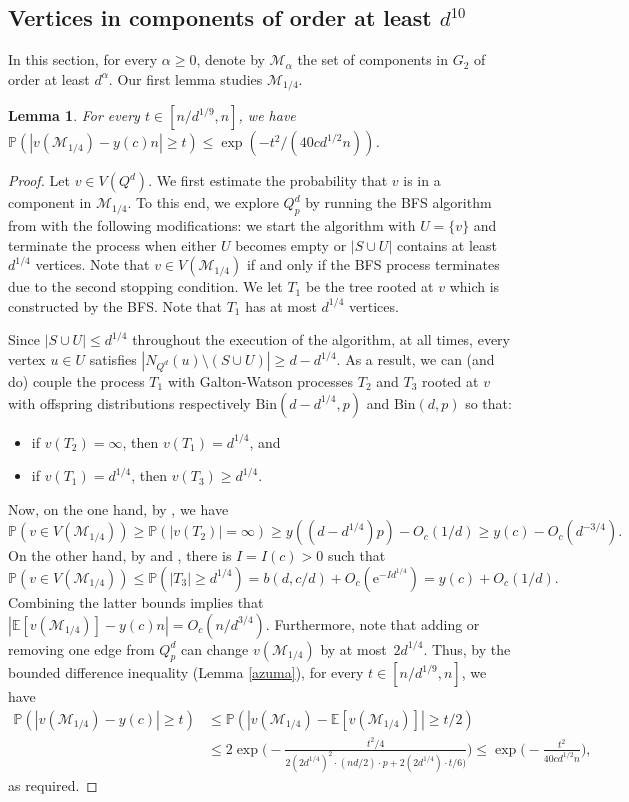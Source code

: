 \documentclass[reqno,final,a4paper]{amsart}
\newtheorem{lemma}[thm]{Lemma}
\theoremstyle{definition}
\newcommand{\cM}{\mathcal{M}}
\def\e{\mathrm{e}}
\newcommand{\1}{\mathbbm{1}}
\begin{document}
\subsection{\texorpdfstring{Vertices in components of order at least $d^{10}$}{Vertices in large components}}\label{subsec: vol}
In this section, for every $\alpha \ge 0$, denote by $\cM_\alpha$ the set of components in $G_2$ of order at least $d^{\alpha}$.
Our first lemma studies $\cM_{1/4}$.
\begin{lemma}\label{l: volume of large}
For every $t\in [n/d^{1/9},n]$, we have
$\mathbb{P}(|v(\cM_{1/4}) - y(c)n|\ge t)\le \exp(-t^2/(40cd^{1/2}n))$.
\end{lemma}
\begin{proof}
Let $v\in V(Q^d)$.
We first estimate the probability that $v$ is in a component in $\cM_{1/4}$. 
To this end, we explore $Q^d_p$ by running the BFS algorithm from  with the following modifications: we start the algorithm with $U=\{v\}$ and terminate the process when either $U$ becomes empty or $|S\cup U|$ contains at least $d^{1/4}$ vertices. 
Note that $v\in V(\cM_{1/4})$ if and only if the BFS process terminates due to the second stopping condition. 
We let $T_1$ be the tree rooted at $v$ which is constructed by the BFS. Note that $T_1$ has at most $d^{1/4}$ vertices.

Since $|S\cup U|\le d^{1/4}$ throughout the execution of the algorithm, at all times, every vertex $u\in U$ satisfies $|N_{Q^d}(u)\setminus (S\cup U)|\ge d-d^{1/4}$. 
As a result, we can (and do) couple the process $T_1$ with Galton-Watson processes $T_2$ and $T_3$ rooted at $v$ with offspring distributions respectively $\mathrm{Bin}(d-d^{1/4},p)$ and $\mathrm{Bin}(d,p)$ so that:
\begin{itemize}
    \item if $v(T_2)=\infty$, then $v(T_1)=d^{1/4}$, and
    \item if $v(T_1)=d^{1/4}$, then $v(T_3)\ge d^{1/4}$.
\end{itemize}

Now, on the one hand, by , we have 
\[\mathbb{P}(v\in V(\cM_{1/4}))\ge \mathbb{P}(|v(T_2)|=\infty) \ge y((d-d^{1/4})p)-O_c(1/d)\ge y(c)-O_c(d^{-3/4}).\] 
On the other hand, by  and , there is $I=I(c)>0$ such that 
\[\mathbb{P}(v\in V(\cM_{1/4}))\le \mathbb P(|T_3|\ge d^{1/4})=b(d,c/d)+O_c(\e^{-Id^{1/4}})=y(c)+O_c(1/d).\]
Combining the latter bounds implies that $|\mathbb E[v(\cM_{1/4})]-y(c)n|=O_c(n/d^{3/4})$.
Furthermore, note that adding or removing one edge from $Q^d_p$ can change $v(\cM_{1/4})$ by at most~$2d^{1/4}$.
Thus, by the bounded difference inequality (Lemma \ref{azuma}), for every $t\in [n/d^{1/9},n]$, we have
\begin{align*}
\mathbb{P}(|v(\cM_{1/4})-y(c)|\ge t)&\le \mathbb{P}(|v(\cM_{1/4})- \mathbb{E}[v(\cM_{1/4})]|\ge t/2)\\
&\le 2\exp\bigg(-\frac{t^2/4}{2 (2d^{1/4})^2\cdot (nd/2)\cdot p + 2 (2d^{1/4})\cdot t/6)}\bigg)\le \exp\bigg(-\frac{t^2}{40cd^{1/2}n}\bigg),
\end{align*}
as required.
\end{proof}
\end{document}
